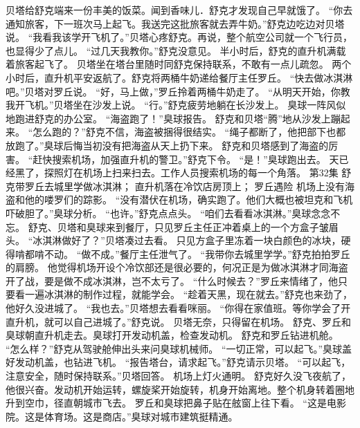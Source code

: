 \documentclass[a4paper,12pt,UTF8,twoside]{ctexbook}
\begin{document}
        贝塔给舒克端来一份丰美的饭菜。闻到香味儿．舒克才发现自己早就饿了。 
        “你去通知旅客，下一班次马上起飞。我送完这批旅客就去弄牛奶。”舒克边吃边对贝塔说。 
        “我看我该学开飞机了。”贝塔心疼舒克。再说，整个航空公司就一个飞行员，也显得少了点儿。 
        “过几天我教你。”舒克没意见。 
        半小时后，舒克的直升机满载着旅客起飞了。 
        贝塔坐在塔台里随时同舒克保持联系，不敢有一点儿疏忽。 
        两个小时后，直升机平安返航了。舒克将两桶牛奶递给餐厅主任罗丘。 
        “快去做冰淇淋吧。”贝塔对罗丘说。 
        “好，马上做，”罗丘拎着两桶牛奶走了。 
        “从明天开始，你教我开飞机。”贝塔坐在沙发上说。 
        “行。”舒克疲劳地躺在长沙发上。 
        臭球一阵风似地跑进舒克的办公室。 
        “海盗跑了！”臭球报告。 
        舒克和贝塔“腾”地从沙发上蹦起来。 
        “怎么跑的？”舒克不信，海盗被捆得很结实。 
        “绳子都断了，他把部下也都放跑了。”臭球后悔当初没有把海盗从天上扔下来。 
        舒克和贝塔感到了海盗的厉害。 
        “赶快搜索机场，加强直升机的警卫。”舒克下令。 
        “是！”臭球跑出去。 
        天已经黑了，探照灯在机场上扫来扫去。工作人员搜索机场的每一个角落。   第32集 
        舒克带罗丘去城里学做冰淇淋； 
        直升机落在冷饮店房顶上； 
        罗丘遇险   
        机场上没有海盗和他的喽罗们的踪影。 
        “没有潜伏在机场，确实跑了。他们大概也被坦克和飞机吓破胆了。”臭球分析。 
        “也许。”舒克点点头。 
        “咱们去看看冰淇淋。”臭球念念不忘。 
        舒克、贝塔和臭球来到餐厅，只见罗丘主任正冲着桌上的一个方盒子皱眉头。 
        “冰淇淋做好了？”贝塔凑过去看。 
        只见方盒子里冻着一块白颜色的冰块，硬得啃都啃不动。 
        “做不成。”餐厅主任泄气了。 
        “我带你去城里学学。”舒克拍拍罗丘的肩膀。 
        他觉得机场开设个冷饮部还是很必要的，何况正是为做冰淇淋才同海盗开了战，要是做不成冰淇淋，岂不太亏了。 
        “什么时候去？”罗丘来情绪了，他只要看一遍冰淇淋的制作过程，就能学会。 
        “趁着天黑，现在就去。”舒克也来劲了，他好久没进城了。 
        “我也去。”贝塔想去看看咪丽。 
        “你得在家值班。等你学会了开直升机，就可以自己进城了。”舒克说。 
        贝塔无奈，只得留在机场。 
        舒克、罗丘和臭球朝直升机走去。臭球打开发动机盖，检查发动机。 
        舒克和罗丘钻进机舱。 
        “怎么样？”舒克从驾驶舱伸出头来问臭球机械师。 
        “一切正常，可以起飞。”臭球盖好发动机盖，也钻进飞机。 
        “报告塔台，请求起飞。”舒克请示贝塔。 
        “可以起飞，注意安全，随时保持联系。”贝塔回答。 
        机场上灯火通明。 
        舒克好久没飞夜航了，他很兴奋。发动机开始运转，螺旋桨开始旋转，机身开始离地。整个机身转着圈地升到空巾，径直朝城市飞去。 
        罗丘和臭球把鼻子贴在舷窗上往下看。 
        “这是电影院。这是体育场。这是商店。”臭球对城市建筑挺精通。 
\end{document}
